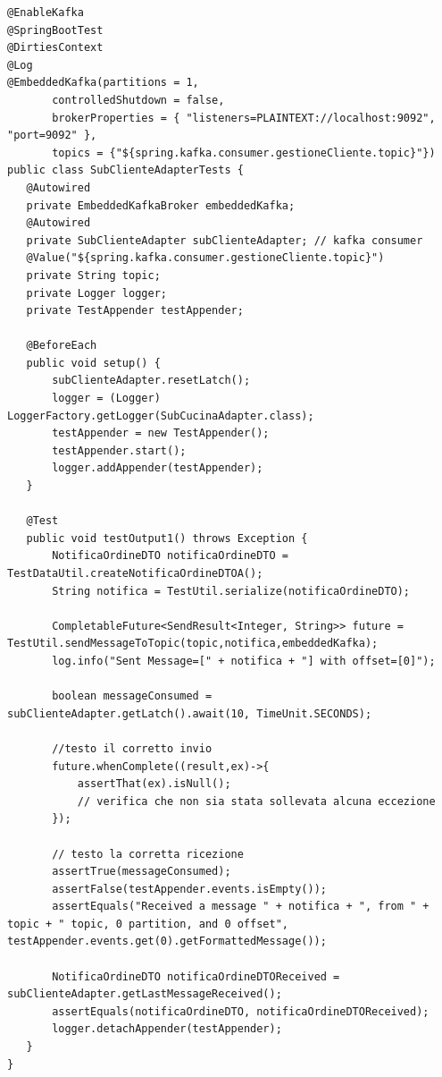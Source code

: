 \begin{lstlisting}[style=myJava, 
    caption={Test di integrazione per il consumer SubClienteAdapter}, label=lst:SubClienteAdapterTest,
    emph={[2] kafkaTemplate , objectMapper, topic, payload, log, producer, embeddedKafka, logger, testAppender,},
    emphstyle={[2]\color{codeDarkMagenta}},
    emph={[3] setup, testOutput1 },
    emphstyle={[3]\color{codeCyan}}]
@EnableKafka
@SpringBootTest
@DirtiesContext
@Log
@EmbeddedKafka(partitions = 1,
       controlledShutdown = false,
       brokerProperties = { "listeners=PLAINTEXT://localhost:9092", "port=9092" },
       topics = {"${spring.kafka.consumer.gestioneCliente.topic}"})
public class SubClienteAdapterTests {
   @Autowired
   private EmbeddedKafkaBroker embeddedKafka;
   @Autowired
   private SubClienteAdapter subClienteAdapter; // kafka consumer
   @Value("${spring.kafka.consumer.gestioneCliente.topic}")
   private String topic;
   private Logger logger;
   private TestAppender testAppender;

   @BeforeEach
   public void setup() {
       subClienteAdapter.resetLatch();
       logger = (Logger) LoggerFactory.getLogger(SubCucinaAdapter.class);
       testAppender = new TestAppender();
       testAppender.start();
       logger.addAppender(testAppender);
   }

   @Test
   public void testOutput1() throws Exception {
       NotificaOrdineDTO notificaOrdineDTO = TestDataUtil.createNotificaOrdineDTOA();
       String notifica = TestUtil.serialize(notificaOrdineDTO);

       CompletableFuture<SendResult<Integer, String>> future = TestUtil.sendMessageToTopic(topic,notifica,embeddedKafka);
       log.info("Sent Message=[" + notifica + "] with offset=[0]");

       boolean messageConsumed = subClienteAdapter.getLatch().await(10, TimeUnit.SECONDS);

       //testo il corretto invio
       future.whenComplete((result,ex)->{
           assertThat(ex).isNull(); 
           // verifica che non sia stata sollevata alcuna eccezione
       });

       // testo la corretta ricezione
       assertTrue(messageConsumed);
       assertFalse(testAppender.events.isEmpty());
       assertEquals("Received a message " + notifica + ", from " + topic + " topic, 0 partition, and 0 offset", testAppender.events.get(0).getFormattedMessage());

       NotificaOrdineDTO notificaOrdineDTOReceived = subClienteAdapter.getLastMessageReceived();
       assertEquals(notificaOrdineDTO, notificaOrdineDTOReceived);
       logger.detachAppender(testAppender);
   }
}
\end{lstlisting}
